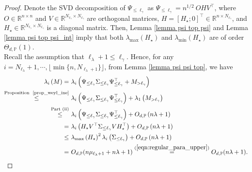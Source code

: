 \documentclass{article}
\theoremstyle{plain}
\theoremstyle{definition}
\theoremstyle{remark}
\newcommand{\dhnote}[1]{{\color{red}[#1]} } %
\begin{document}
\begin{appendix}
\begin{proof}
Denote the SVD decomposition of $ \Psi_{\leq \ell_{\gamma}} $ as $ \Psi_{\leq \ell_{\gamma}} = n^{1/2} ~ O H V^{\top} $, where $ O \in \mathbb{R}^{n \times n}$ and $ V \in \mathbb{R}^{N_{\ell_{\gamma}} \times N_{\ell_{\gamma}}}$ are orthogonal matrices, $H = \left[ H_{\star}; 0 \right]^{\top} \in \mathbb{R}^{n \times N_{\ell_{\gamma}}} $, and $H_{\star} \in \mathbb{R}^{N_{\ell_{\gamma}} \times N_{\ell_{\gamma}}} $ is a diagonal matrix. Then, Lemma \ref{lemma psi top psi} and Lemma \ref{lemma psi top psi_int} imply that both $\lambda_{\text{max}}\left(H_{\star}\right)$ and $  \lambda_{\text{min}}\left(H_{\star}\right)$ are of order $\Theta_{d, \mathbb{P}}(1)$.\\
Recall the assumption that  $\ell_{\lambda}+1 \leq \ell_{\gamma}$. Hence, for any $i=N_{\ell_{\lambda}}+1, \cdots, \lfloor\min\{n, N_{\ell_{\lambda}+1}\}\rfloor$, from Lemma \ref{lemma psi psi top}, we have 
\begin{equation*}
        \begin{aligned}
        \lambda_{i}\left( M\right) 
        = &~ \lambda_{i}\left( \Psi_{\leq \ell_{\gamma}}\Sigma_{\leq \ell_{\gamma}} \Psi_{\leq \ell_{\gamma}}^{\top} + M_{>\ell_{\gamma}}\right)\\
        \overset{\text{Proposition~ \ref{prop_weyl_ine}}}{\leq}&~
        \lambda_{i} \left(  \Psi_{\leq \ell_{\gamma}}\Sigma_{\leq \ell_{\gamma}} \Psi_{\leq \ell_{\gamma}}^{\top}  \right) + \lambda_{1}\left(  M_{>\ell_{\gamma}} \right)\\
        \overset{\text{Part (ii)}}{\leq} &~
        \lambda_{i} \left(  \Psi_{\leq \ell_{\gamma}}\Sigma_{\leq \ell_{\gamma}} \Psi_{\leq \ell_{\gamma}}^{\top}  \right) + O_{d, \mathbb{P}}\left(n\lambda+1\right)\\
        =&~ \lambda_{i} \left(  H_{\star} V^{\top} \Sigma_{\leq \ell_{\gamma}} V H_{\star}^{\top}  \right) + O_{d, \mathbb{P}}\left(n\lambda+1\right)\\
        \leq &~ 
        \lambda_{\text{max}}\left(H_{\star}\right)^2 \lambda_{i} \left(\Sigma_{\leq \ell_{\gamma}} \right) + O_{d, \mathbb{P}}\left(n\lambda+1\right)\\
        =&~ O_{d, \mathbb{P}}(n\mu_{\ell_{\lambda}+1} + n\lambda+1) \overset{(\ref{eqn:regular_para_upper})}{=} O_{d, \mathbb{P}}(n\lambda+1).
    \end{aligned}
\end{equation*}





\end{proof}
\end{appendix}
\end{document}
